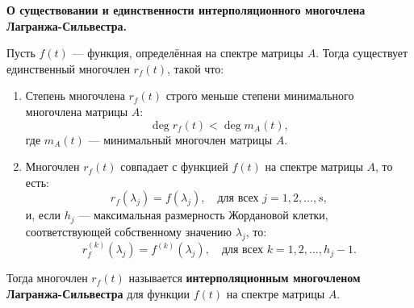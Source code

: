 \begin{shth}
    \begin{theorem}
        \textbf{О существовании и единственности интерполяционного многочлена Лагранжа-Сильвестра.} 
        
        Пусть \( f(t) \) — функция, определённая на спектре матрицы \( A \). Тогда существует единственный многочлен \( r_f(t) \), такой что:
        \begin{enumerate}
            \item Степень многочлена \( r_f(t) \) строго меньше степени минимального многочлена матрицы \( A \):
            \[
            \deg r_f(t) < \deg m_A(t),
            \]
            где \( m_A(t) \) — минимальный многочлен матрицы \( A \).
            \item Многочлен \( r_f(t) \) совпадает с функцией \( f(t) \) на спектре матрицы \( A \), то есть:
            \[
            r_f(\lambda_j) = f(\lambda_j), \quad \text{для всех } j = 1, 2, \ldots, s,
            \]
            и, если \( h_j \) — максимальная размерность Жордановой клетки, соответствующей собственному значению \( \lambda_j \), то:
            \[
            r_f^{(k)}(\lambda_j) = f^{(k)}(\lambda_j), \quad \text{для всех } k = 1, 2, \ldots, h_j - 1.
            \]
        \end{enumerate}
        Тогда многочлен \( r_f(t) \) называется \textbf{интерполяционным многочленом Лагранжа-Сильвестра} для функции \( f(t) \) на спектре матрицы \( A \).
    \end{theorem}
\end{shth}


